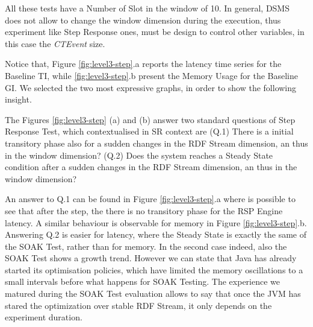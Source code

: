 All these tests have a Number of Slot in the window of 10. In general, DSMS does not allow to change the window dimension during the execution, thus experiment like Step Response ones, must be design to control other variables, in this case the \textit{CTEvent} size.

Notice that, Figure \ref{fig:level3-step}.a reports the latency time series for the Baseline TI, while \ref{fig:level3-step}.b present the Memory Usage for the Baseline GI. We selected the two most expressive graphs, in order to show the following insight.

The Figures \ref{fig:level3-step} (a) and (b) answer two standard questions of Step Response Test, which contextualised in SR context are (Q.1) There is a initial transitory phase also for a sudden changes in the RDF Stream dimension, an thus in the window dimension? (Q.2) Does the system reaches a Steady State condition after a sudden changes in the RDF Stream dimension, an thus in the window dimension?

An answer to Q.1 can be found in Figure \ref{fig:level3-step}.a where is possible to see that after the step, the there is no transitory phase for the RSP Engine latency. A similar behaviour is observable for memory in Figure \ref{fig:level3-step}.b. Answering Q.2 is easier for latency, where the Steady State is exactly the same of the SOAK Test, rather than for memory. In the second case indeed, also the SOAK Test shows a growth trend. However we can state that Java has already started its optimisation policies, which have limited the memory oscillations to a small intervals before what happens for SOAK Testing. The experience we matured during the SOAK Test evaluation allows to say that once the JVM has stared the optimization over stable RDF Stream, it only depends on the experiment duration.



